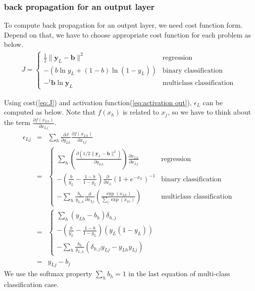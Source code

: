 \documentclass{article}
\begin{document}
\subsubsection{back propagation for an output layer}
To compute back propagation for an output layer, we need cost function form.
Depend on that, we have to choose appropriate cost function for each
problem as below.
\begin{eqnarray}
  J = 
  \begin{cases}
    \frac{1}{2} \lVert \bm{y}_L-\bm{b} \rVert ^2  &\mbox{regression }\\ 
    -(b \ln y_L + (1-b)\ln(1-y_L)) &\mbox{binary classification} \\
    -{}^t\bm{b} \ln \bm{y}_L &\mbox{multiclass classification} 
  \end{cases} \label{eq:J}
\end{eqnarray}

Using cost(\ref{eq:J}) and activation function(\ref{eq:activation out}),
$\epsilon_L$ can be computed as below.
Note that $f(x_h)$ is related to $x_j$, so we have to think about the term
$\frac{\partial f(x_{Lh})}{\partial x_{Lj}}$.
\begin{eqnarray}
  \epsilon_{Lj} 
  &=& \sum_h \frac{\partial J}{\partial y_{Lh}} \frac{\partial
    f(x_{Lh})}{\partial x_{Lj}}\\
  &=&
  \begin{cases}
    \sum_h (\frac{\partial (1/2 \lVert \bm{y}_L-\bm{b} \rVert ^2)}{\partial
      y_{Lh}}) \frac{\partial x_{Lh}}{\partial x_{Lj}}
    &\mbox{regression }\\
    -(\frac{b}{y_L} - \frac{1-b}{1-y_L}) \frac{\partial}{\partial
      x_{L}}(1+e^{-x_L})^{-1}   &\mbox{binary classification}\\
    -\sum_h \frac{b_h}{y_{L,h}} \frac{\partial}{\partial
      x_{Lj}}(\frac{\exp(x_{Lh})}{\sum_i \exp(x_{Li})})
    &\mbox{multiclass classification}
  \end{cases} \\
  &=&
  \begin{cases}
    \sum_h (y_{Lh}-b_h) \delta_{h,j}\\
    -(\frac{b}{y_L} - \frac{1-b}{1-y_L})(y_L(1-y_L))\\
    -\sum_h \frac{b_h}{y_{L,h}} (\delta_{h,j}y_{Lj} - y_{Lh}y_{Lj})
  \end{cases}\\
  &=&  y_{Lj}-b_j
\end{eqnarray}
We use the softmax property $\sum_h b_h = 1$ in the last equation of multi-class
classification case.
\end{document}
